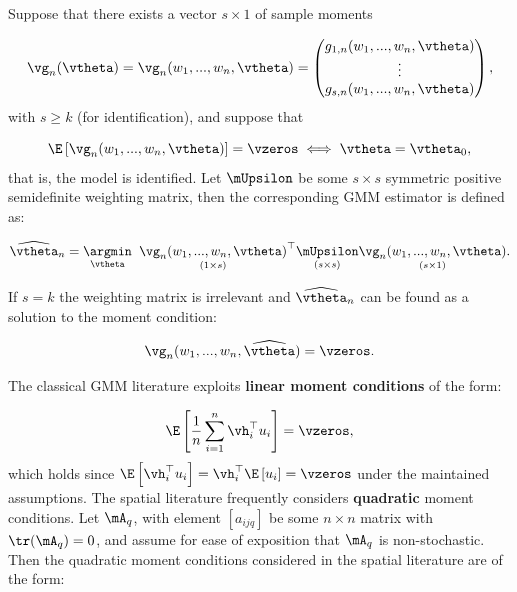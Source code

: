 \documentclass[english,12pt]{book}\usepackage[]{graphicx}\usepackage[]{xcolor}
\begin{document}
Suppose that there exists a vector $s \times 1$ of sample moments

\begin{equation*}
\vg_n(\vtheta) = \vg_n(w_1,...,w_n, \vtheta) = \begin{pmatrix}
g_{1,n}(w_1,...,w_n, \vtheta) \\
\vdots \\
g_{s,n}(w_1,...,w_n, \vtheta)
\end{pmatrix},
\end{equation*}
%
with $s \geq k$ (for identification), and suppose that

\begin{equation*}
\E\left[\vg_n(w_1,...,w_n, \vtheta)\right] = \vzeros \iff \vtheta = \vtheta_0,
\end{equation*}
%
that is, the model is identified. Let $\mUpsilon$ be some $s \times s$ symmetric positive semidefinite weighting matrix, then the corresponding GMM estimator is defined as:

\begin{equation}\label{eq:gmm_one_step}
\widehat{\vtheta}_n = \underset{\vtheta}{\argmin}\;\;\underset{(1\times s)}{\vg_n(w_1,...,w_n, \vtheta)}^\top\underset{(s\times s)}{\mUpsilon}\underset{(s\times 1)}{\vg_n(w_1,...,w_n, \vtheta)}.
\end{equation}

If $s = k$  the weighting matrix is irrelevant and $\widehat{\vtheta}_n$ can be found as a solution to the moment condition:

\begin{equation}\label{eq:sample_moments_gmm}
\vg_n(w_1,...,w_n, \widehat{\vtheta}) = \vzeros.
\end{equation}

The classical GMM literature exploits \textbf{linear moment conditions} of the form:

\begin{equation*}
	\E\left[\frac{1}{n}\sum_{i =1}^n\vh_{i}^\top u_i\right] = \vzeros,
\end{equation*}
%
which holds since $\E\left[\vh_{i}^\top u_i\right] = \vh_{i}^\top \E\left[u_i\right] = \vzeros$ under the maintained assumptions. The spatial literature frequently considers \textbf{quadratic} moment conditions. Let $\mA_q$, with element $\left[a_{ijq}\right]$ be some $n \times n$ matrix with $\tr(\mA_q) = 0$, and assume for ease of exposition that $\mA_q$ is non-stochastic. Then the quadratic moment conditions considered in the spatial literature are of the form:
\end{document}
